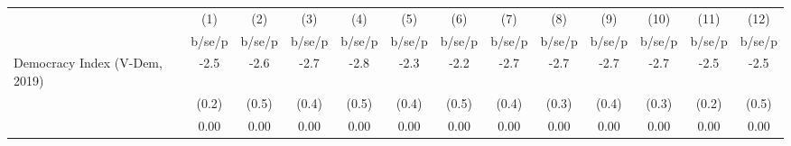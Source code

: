 \begin{tabular}{l*{12}{c}}
\hline\hline
                    &\multicolumn{1}{c}{(1)}&\multicolumn{1}{c}{(2)}&\multicolumn{1}{c}{(3)}&\multicolumn{1}{c}{(4)}&\multicolumn{1}{c}{(5)}&\multicolumn{1}{c}{(6)}&\multicolumn{1}{c}{(7)}&\multicolumn{1}{c}{(8)}&\multicolumn{1}{c}{(9)}&\multicolumn{1}{c}{(10)}&\multicolumn{1}{c}{(11)}&\multicolumn{1}{c}{(12)}\\
                    &      b/se/p&      b/se/p&      b/se/p&      b/se/p&      b/se/p&      b/se/p&      b/se/p&      b/se/p&      b/se/p&      b/se/p&      b/se/p&      b/se/p\\
\hline
Democracy Index (V-Dem, 2019)&        -2.5&        -2.6&        -2.7&        -2.8&        -2.3&        -2.2&        -2.7&        -2.7&        -2.7&        -2.7&        -2.5&        -2.5\\
                    &       (0.2)&       (0.5)&       (0.4)&       (0.5)&       (0.4)&       (0.5)&       (0.4)&       (0.3)&       (0.4)&       (0.3)&       (0.2)&       (0.5)\\
                    &        0.00&        0.00&        0.00&        0.00&        0.00&        0.00&        0.00&        0.00&        0.00&        0.00&        0.00&        0.00\\
\hline\hline
\end{tabular}
